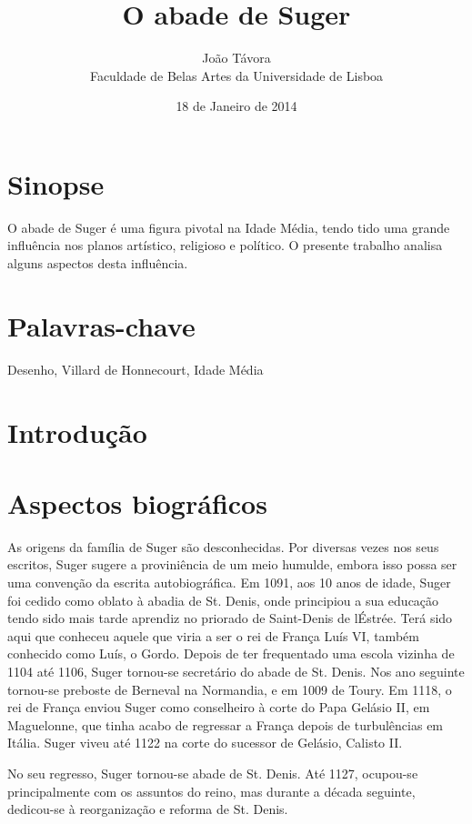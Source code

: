 \documentclass{article}
\title{O abade de Suger}
\date{18 de Janeiro de 2014}
\author{João Távora \\Faculdade de Belas Artes da Universidade de Lisboa}
\begin{document}
\maketitle

\section{Sinopse}

O abade de Suger é uma figura pivotal na Idade Média, tendo tido uma
grande influência nos planos artístico, religioso e político. O
presente trabalho analisa alguns aspectos desta influência.

\section{Palavras-chave}

Desenho, Villard de Honnecourt, Idade Média

\section{Introdução}



\section{Aspectos biográficos}

As origens da família de Suger são desconhecidas. Por diversas vezes
nos seus escritos, Suger sugere a proviniência de um meio humulde,
embora isso possa ser uma convenção da escrita autobiográfica. Em
1091, aos 10 anos de idade, Suger foi cedido como oblato à abadia de
St. Denis, onde principiou a sua educação tendo sido mais tarde
aprendiz no priorado de Saint-Denis de lÉstrée. Terá sido aqui que
conheceu aquele que viria a ser o rei de França Luís VI, também
conhecido como Luís, o Gordo. Depois de ter frequentado uma escola
vizinha de 1104 até 1106, Suger tornou-se secretário do abade de
St. Denis. Nos ano seguinte tornou-se preboste de Berneval na
Normandia, e em 1009 de Toury. Em 1118, o rei de França enviou Suger
como conselheiro à corte do Papa Gelásio II, em Maguelonne, que tinha
acabo de regressar a França depois de turbulências em Itália. Suger
viveu até 1122 na corte do sucessor de Gelásio, Calisto II.

No seu regresso, Suger tornou-se abade de St. Denis. Até 1127,
ocupou-se principalmente com os assuntos do reino, mas durante a
década seguinte, dedicou-se à reorganização e reforma de St. Denis. 
\end{document}
